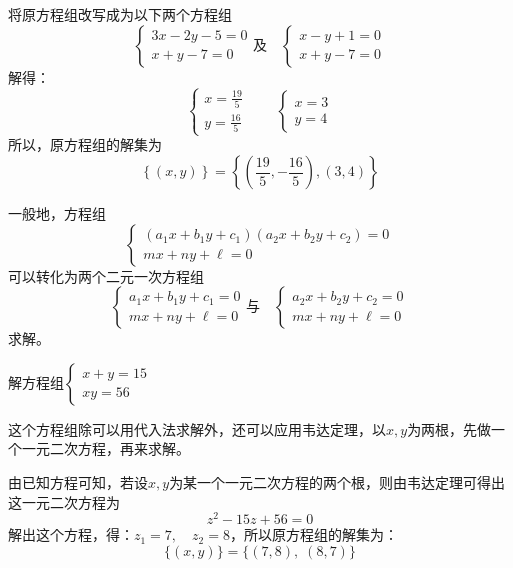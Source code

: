 \begin{solution}
    将原方程组改写成为以下两个方程组
\[\begin{cases}
    3x-2y-5=0\\
    x+y-7=0
\end{cases}\text{及}\quad \begin{cases}
    x-y+1=0\\
    x+y-7=0
\end{cases}\]
解得：
\[\begin{cases}
    x=\frac{19}{5}\\ y=\frac{16}{5}
\end{cases}\qquad \begin{cases}
    x=3\\ y=4
\end{cases}\]
所以，原方程组的解集为
\[\left\{(x,y)\right\}=\left\{\left(\frac{19}{5},-\frac{16}{5}\right), (3,4)\right\}\]
\end{solution}
 
一般地，方程组
\[\begin{cases}
(a_1x+b_1y+c_1)(a_2x+b_2y+c_2)=0\\
mx+ny+\ell=0
\end{cases}\]
可以转化为两个二元一次方程组
\[\begin{cases}
a_1x+b_1y+c_1=0\\
mx+ny+\ell=0
\end{cases}\text{与}\quad \begin{cases}
a_2x+b_2y+c_2=0\\
mx+ny+\ell=0
\end{cases}\]
求解。

\begin{example}
解方程组$\begin{cases}
x+y=15\\xy=56
\end{cases}$
\end{example}

\begin{analyze}
这个方程组除可以用代入法求解外，还可以应用韦达定理，以$x,y$为两根，先做一个一元二次方程，再来求解。
\end{analyze}

\begin{solution}
由已知方程可知，若设$x,y$为某一个一元二次方程的两个根，则由韦达定理可得出这一元二次方程为
\[z^2-15z+56=0\]
解出这个方程，得：$z_1=7,\quad z_2=8$，所以原方程组的解集为：
\[\{(x,y)\}=\{(7,8),\; (8,7)\}\]
\end{solution}

